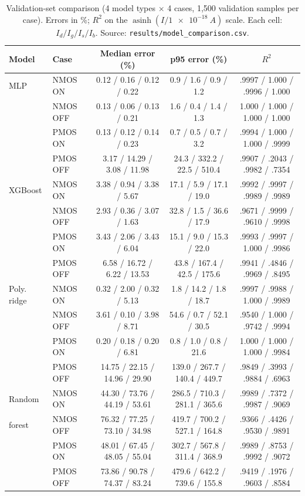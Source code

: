 \documentclass[11pt,a4paper]{article}
\begin{document}
\begin{table}[!htbp]
\centering
\footnotesize
\caption{Validation-set comparison (4 model types $\times$ 4 cases, 1{,}500 validation samples per
case). Errors in \%; $R^2$ on the $\operatorname{asinh}(I/\SI{1e-18}{A})$ scale. Each cell:
$I_d / I_g / I_s / I_b$. Source: \texttt{results/model\_comparison.csv}.}
\label{tab:cmp}
\setlength{\tabcolsep}{2.5pt}
\begin{tabular}{llccc}
\toprule
Model & Case & Median error (\%) & p95 error (\%) & $R^2$ \\
\midrule
MLP         & NMOS ON  & 0.12 / 0.16 / 0.12 / 0.22 & 0.9 / 1.6 / 0.9 / 1.2 & .9997 / 1.000 / .9996 / 1.000 \\
            & NMOS OFF & 0.13 / 0.06 / 0.13 / 0.21 & 1.6 / 0.4 / 1.4 / 1.3 & 1.000 / 1.000 / 1.000 / 1.000 \\
            & PMOS ON  & 0.13 / 0.12 / 0.14 / 0.23 & 0.7 / 0.5 / 0.7 / 3.2 & .9994 / 1.000 / 1.000 / .9999 \\
            & PMOS OFF & 3.17 / 14.29 / 3.08 / 11.98 & 24.3 / 332.2 / 22.5 / 510.4 & .9907 / .2043 / .9982 / .7354 \\
\midrule
XGBoost     & NMOS ON  & 3.38 / 0.94 / 3.38 / 5.67 & 17.1 / 5.9 / 17.1 / 19.0 & .9992 / .9997 / .9989 / .9989 \\
            & NMOS OFF & 2.93 / 0.36 / 3.07 / 1.63 & 32.8 / 1.5 / 36.6 / 17.9 & .9671 / .9999 / .9610 / .9998 \\
            & PMOS ON  & 3.43 / 2.06 / 3.43 / 6.04 & 15.1 / 9.0 / 15.3 / 22.0 & .9993 / .9997 / 1.000 / .9986 \\
            & PMOS OFF & 6.58 / 16.72 / 6.22 / 13.53 & 43.8 / 167.4 / 42.5 / 175.6 & .9941 / .4846 / .9969 / .8495 \\
\midrule
Poly. ridge & NMOS ON  & 0.32 / 2.00 / 0.32 / 5.13 & 1.8 / 14.2 / 1.8 / 18.7 & .9997 / .9988 / 1.000 / .9989 \\
            & NMOS OFF & 3.61 / 0.10 / 3.98 / 8.71 & 54.6 / 0.7 / 52.1 / 30.5 & .9540 / 1.000 / .9742 / .9994 \\
            & PMOS ON  & 0.20 / 0.18 / 0.20 / 6.81 & 0.8 / 1.0 / 0.8 / 21.6 & 1.000 / 1.000 / 1.000 / .9984 \\
            & PMOS OFF & 14.75 / 22.15 / 14.96 / 29.90 & 139.0 / 267.7 / 140.4 / 449.7 & .9849 / .3993 / .9884 / .6963 \\
\midrule
Random      & NMOS ON  & 44.30 / 73.76 / 44.19 / 53.61 & 286.5 / 710.3 / 281.1 / 365.6 & .9989 / .7372 / .9987 / .9069 \\
forest      & NMOS OFF & 76.32 / 77.25 / 73.10 / 34.98 & 419.7 / 700.2 / 527.1 / 164.8 & .9366 / .4426 / .9530 / .9891 \\
            & PMOS ON  & 48.01 / 67.45 / 48.05 / 55.04 & 302.7 / 567.8 / 311.4 / 368.9 & .9989 / .8753 / .9992 / .9072 \\
            & PMOS OFF & 73.86 / 90.78 / 74.37 / 83.24 & 479.6 / 642.2 / 739.6 / 155.8 & .9419 / .1976 / .9603 / .8584 \\
\bottomrule
\end{tabular}
\end{table}
\end{document}
